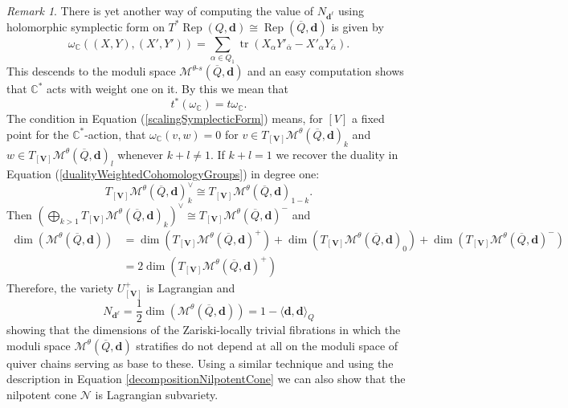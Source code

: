 \documentclass{amsart}
\theoremstyle{plain}
\numberwithin{equation}{section}
\theoremstyle{definition}
\theoremstyle{remark}
\newtheorem{remark}[theorem]{Remark}
\begin{document}
\begin{remark}
There is yet another way of computing the value of $N_{\mathbf{d}^\ell}$ using holomorphic symplectic form on $T^*\operatorname{Rep}(Q,\mathbf{d})\cong \operatorname{Rep}(\overline{Q},\mathbf{d})$ is given by 
$$
\omega_\mathbb{C}((X,Y),(X',Y'))=\sum_{\alpha\in Q_1}\operatorname{tr}(X_{\alpha}Y'_{\overline{\alpha}}-X'_{\alpha}Y_{\overline{\alpha}}).
$$
This descends to the moduli space $\mathcal{M}^{\theta\text{-}s}(\overline{Q},\mathbf{d})$ and an easy computation shows that $\mathbb{C}^*$ acts with weight one on it. By this we mean that 
\begin{equation}\label{scalingSymplecticForm}
t^*(\omega_{\mathbb{C}})=t\omega_{\mathbb{C}}.
\end{equation}
The condition in Equation (\ref{scalingSymplecticForm}) means, for $[V]$ a fixed point for the $\mathbb{C}^*$-action, that $\omega_{\mathbb{C}}(v,w)=0$ for $v\in T_{[\mathbf{V}]}\mathcal{M}^\theta(\overline{Q},\mathbf{d})_k$ and $w\in T_{[\mathbf{V}]}\mathcal{M}^\theta(\overline{Q},\mathbf{d})_l$ whenever $k+l\neq1$. If $k+l=1$ we recover the duality in Equation (\ref{dualityWeightedCohomologyGroups}) in degree one:
$$
T_{[\mathbf{V}]}\mathcal{M}^\theta(\overline{Q},\mathbf{d})_k^\vee\cong T_{[\mathbf{V}]}\mathcal{M}^\theta(\overline{Q},\mathbf{d})_{1-k}.
$$
Then $(\bigoplus_{k>1}T_{[\mathbf{V}]}\mathcal{M}^\theta(\overline{Q},\mathbf{d})_k)^\vee\cong T_{[\mathbf{V}]}\mathcal{M}^\theta(\overline{Q},\mathbf{d})^-$ and
\begin{align*}
\dim(\mathcal{M}^\theta(\overline{Q},\mathbf{d}))&=\dim(T_{[\mathbf{V}]}\mathcal{M}^\theta(\overline{Q},\mathbf{d})^+)+\dim(T_{[\mathbf{V}]}\mathcal{M}^\theta(\overline{Q},\mathbf{d})_0)+\dim(T_{[\mathbf{V}]}\mathcal{M}^\theta(\overline{Q},\mathbf{d})^-)\\
&=2\dim(T_{[\mathbf{V}]}\mathcal{M}^\theta(\overline{Q},\mathbf{d})^+)
\end{align*}
Therefore, the variety $U_{[\mathbf{V}]}^+$ is Lagrangian and 
$$
N_{\mathbf{d}^\ell}=\frac{1}{2}\dim(\mathcal{M}^\theta(\overline{Q},\mathbf{d}))=1-\langle\mathbf{d},\mathbf{d}\rangle_Q
$$
showing that the dimensions of the Zariski-locally trivial fibrations in which the moduli space $\mathcal{M}^\theta(\overline{Q},\mathbf{d})$ stratifies do not depend at all on the moduli space of quiver chains serving as base to these.  Using a similar technique and using the description in Equation \ref{decompositionNilpotentCone} we can also show that the nilpotent cone $\mathcal{N}$ is Lagrangian subvariety.
\end{remark}
\end{document}
